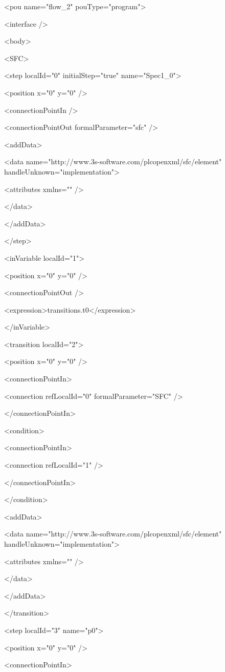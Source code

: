 {<pou name="flow\_2" pouType="program">

<interface />

<body>

<SFC>

 <step localId="0" initialStep="true" name="Spec1\_0">

  <position x="0" y="0" />

  <connectionPointIn />

  <connectionPointOut formalParameter="sfc" />

  <addData>

   <data name="http://www.3s-software.com/plcopenxml/sfc/element" handleUnknown="implementation">

    <attributes xmlns="" />

   </data>

  </addData>

 </step>

 <inVariable localId="1">

  <position x="0" y="0" />

  <connectionPointOut />

  <expression>transitions.t0</expression>

 </inVariable>

 <transition localId="2">

  <position x="0" y="0" />

  <connectionPointIn>

   <connection refLocalId="0" formalParameter="SFC" />

  </connectionPointIn>

  <condition>

   <connectionPointIn>

    <connection refLocalId="1" />

   </connectionPointIn>

  </condition>

  <addData>

   <data name="http://www.3s-software.com/plcopenxml/sfc/element" handleUnknown="implementation">

    <attributes xmlns="" />

   </data>

  </addData>

 </transition>

 <step localId="3" name="p0">

  <position x="0" y="0" />

  <connectionPointIn>

}
